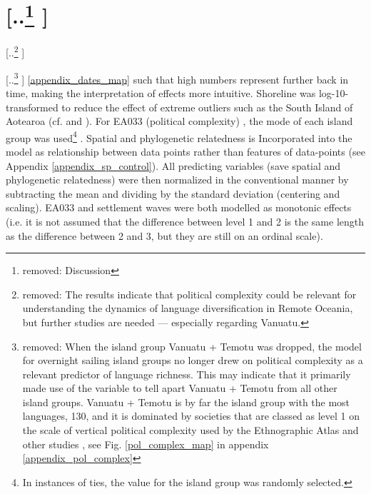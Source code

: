 \documentclass[unnumsec,webpdf,modern,medium]{oup-authoring-template}
\providecommand{\DIFaddtex}[1]{{\protect\color{blue} \sf #1}} %
\providecommand{\DIFdeltex}[1]{{\protect\color{red} [..\footnote{removed: #1} ]}} %
\providecommand{\DIFaddbegin}{} %
\providecommand{\DIFaddend}{} %
\providecommand{\DIFdelend}{} %
\providecommand{\DIFadd}[1]{\texorpdfstring{\DIFaddtex{#1}}{#1}} %
\providecommand{\DIFdel}[1]{\texorpdfstring{\DIFdeltex{#1}}{}} %
\newcommand{\DIFaddincludegraphics}[2][]{{\color{blue}\fbox{\DIFOincludegraphics[#1]{#2}}}} %
\DeclareRobustCommand{\DIFaddbegin}{\DIFOaddbegin \let\includegraphics\DIFaddincludegraphics} %
\DeclareRobustCommand{\DIFaddend}{\DIFOaddend \let\includegraphics\DIFOincludegraphics} %
\DeclareRobustCommand{\DIFdelend}{\DIFOaddend \let\includegraphics\DIFOincludegraphics} %
\begin{document}


\section{\DIFdel{Discussion}}
\addtocounter{section}{-1}%
\DIFdel{The results indicate that political complexity could be relevant for understanding the dynamics of language diversification in Remote Oceania, but further studies are needed --- especially regarding Vanuatu. 
}%

\DIFdel{When the island group Vanuatu + Temotu was dropped, the model for overnight sailing island groups no longer drew on political complexity as a relevant predictor of language richness. This may indicate that it primarily made use of the variable to tell apart Vanuatu + Temotu from all other island groups. Vanuatu + Temotu is by far the island group with the most languages, 130, and it is dominated by societies that are classed as level 1 on the scale of vertical political complexity used by the Ethnographic Atlas \citep{gray1998ethnographic} and other studies \citep{watts_2018}, see Fig. \ref{pol_complex_map} in appendix \ref{appendix_pol_complex}}\DIFdelend \DIFaddbegin \DIFadd{\ref{appendix_dates_map} such that high numbers represent further back in time, making the interpretation of effects more intuitive. Shoreline was log-10-transformed to reduce the effect of extreme outliers such as the South Island of Aotearoa (cf. \citet{rolett2004environmental} and \citet{atkinson2016cultural}). For EA033 (political complexity}\DIFaddend )\DIFaddbegin \DIFadd{, the mode of each island group was used}\footnote{\DIFadd{In instances of ties, the value for the island group was randomly selected.}}\DIFadd{. Spatial and phylogenetic relatedness is Incorporated into the model as relationship between data points rather than features of data-points (see Appendix \ref{appendix_sp_control}). All predicting variables (save spatial and phylogenetic relatedness) were then normalized in the conventional manner by subtracting the mean and dividing by the standard deviation (centering and scaling). EA033 and settlement waves were both modelled as monotonic effects (i.e. it is not assumed that the difference between level 1 and 2 is the same length as the difference between 2 and 3, but they are still on an ordinal scale)}\DIFaddend .
\end{document}
